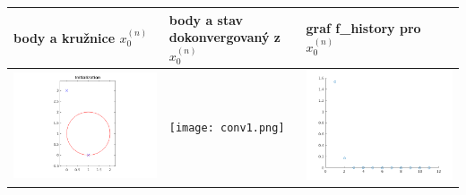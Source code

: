 \documentclass[10pt,a4paper,openright]{article}
\begin{document}
\begin{center}
    \begin{tabular}{| l | l | l |}
    \hline
    body a kružnice $x^{(n)}_0$ & body a stav dokonvergovaný z $x^{(n)}_0$ & graf f\_history pro $x^{(n)}_0$ \\ \hline
    \includegraphics[scale=0.3]{conv1_init.png} & \texttt{[image: conv1.png]} & \includegraphics[scale=0.3]{conv1_history.png}\\ \hline

\end{tabular}
\end{center}
\end{document}
